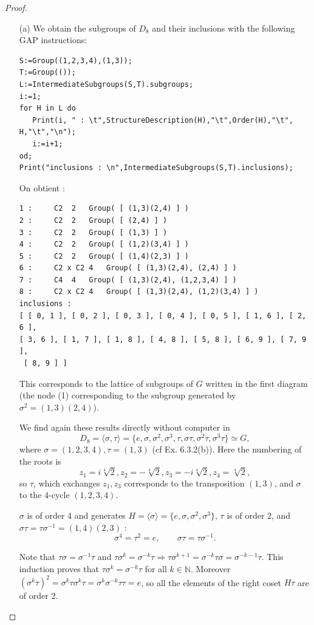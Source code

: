 \documentclass[11pt,a4paper]{article}
\newcommand{\N}{\mathbb{N}}
\begin{document}
\begin{proof}
\begin{enumerate}
\item[(a)]
We obtain the subgroups of $D_8$ and their inclusions with the following GAP instructions:
\begin{verbatim}
S:=Group((1,2,3,4),(1,3));
T:=Group(());
L:=IntermediateSubgroups(S,T).subgroups;
i:=1;
for H in L do
   Print(i, " : \t",StructureDescription(H),"\t",Order(H),"\t", H,"\t","\n");
   i:=i+1;
od;
Print("inclusions : \n",IntermediateSubgroups(S,T).inclusions);
\end{verbatim}
On obtient :
\begin{verbatim}
1 : 	C2	2	Group( [ (1,3)(2,4) ] )	
2 : 	C2	2	Group( [ (2,4) ] )	
3 : 	C2	2	Group( [ (1,3) ] )	
4 : 	C2	2	Group( [ (1,2)(3,4) ] )	
5 : 	C2	2	Group( [ (1,4)(2,3) ] )	
6 : 	C2 x C2	4	Group( [ (1,3)(2,4), (2,4) ] )	
7 : 	C4	4	Group( [ (1,3)(2,4), (1,2,3,4) ] )	
8 : 	C2 x C2	4	Group( [ (1,3)(2,4), (1,2)(3,4) ] )	
inclusions : 
[ [ 0, 1 ], [ 0, 2 ], [ 0, 3 ], [ 0, 4 ], [ 0, 5 ], [ 1, 6 ], [ 2, 6 ], 
[ 3, 6 ], [ 1, 7 ], [ 1, 8 ], [ 4, 8 ], [ 5, 8 ], [ 6, 9 ], [ 7, 9 ],
 [ 8, 9 ] ]
\end{verbatim}
This corresponds to the lattice of subgroups of $G$ written in the first diagram (the node (1) corresponding to the subgroup generated by $\sigma^2 = (1,3)(2,4)$).

We find again these results directly without computer in $$D_8 = \langle \sigma, \tau  \rangle = \{e, \sigma, \sigma^2, \sigma^3, \tau, \sigma \tau, \sigma^2 \tau, \sigma^3 \tau\}\simeq G,$$ where $\sigma = (1,2,3,4), \tau = (1,3)$ (cf Ex. 6.3.2(b)).  Here the numbering of the roots is $$z_1 = i\sqrt[4]{2},z_2 =  - \sqrt[4]{2}, z_3 = -i  \sqrt[4]{2}, z_4 = \sqrt[4]{2}, $$so $\tau$, which exchanges $z_1,z_3$ corresponds to the transposition $(1,3)$, and $\sigma$ to the $4$-cycle $(1,2,3,4)$.

$\sigma$ is of order 4 and generates $H =\langle  \sigma \rangle =\{e,\sigma, \sigma^2,\sigma^3\}$, $\tau$ is of order 2, and $\sigma \tau = \tau \sigma^{-1} =(1,4)(2,3)$ :
$$\sigma^4 = \tau ^2 = e,\qquad \sigma \tau = \tau \sigma^{-1}.$$

Note that $\tau \sigma = \sigma^{-1} \tau$ and $\tau \sigma^k = \sigma^{-k} \tau \Rightarrow \tau \sigma^{k+1} = \sigma^{-k} \tau \sigma = \sigma^{-k-1} \tau$. This induction proves that $\tau \sigma^k = \sigma^{-k} \tau$ for all $k \in \N$. Moreover $(\sigma^k \tau)^2 = \sigma^k \tau \sigma^k \tau = \sigma^k \sigma^{-k} \tau \tau =e$, so all the elements of the right coset $H\tau$ are of order 2.


\end{enumerate}
\end{proof}
\end{document}
